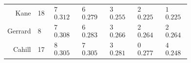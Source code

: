 \documentclass[10pt, a4paper]{UUThesisTemplate}
\begin{document}
\begin{table}[hb]
\begin{tabular}{r l c c c c c}
Kane & 18 & $\begin{matrix} \text{7} \\ 0.312 \end{matrix}$  & $\begin{matrix} \text{6} \\ 0.279 \end{matrix}$  & $\begin{matrix} \text{3} \\ 0.255 \end{matrix}$  & $\begin{matrix} \text{2} \\ 0.225 \end{matrix}$  & $\begin{matrix} \text{1} \\ 0.225 \end{matrix}$\\
Gerrard & 8 & $\begin{matrix} \text{7} \\ 0.308 \end{matrix}$  & $\begin{matrix} \text{6} \\ 0.283 \end{matrix}$  & $\begin{matrix} \text{3} \\ 0.266 \end{matrix}$  & $\begin{matrix} \text{2} \\ 0.264 \end{matrix}$  & $\begin{matrix} \text{2} \\ 0.264 \end{matrix}$\\
Cahill & 17 & $\begin{matrix} \text{8} \\ 0.305 \end{matrix}$  & $\begin{matrix} \text{7} \\ 0.305 \end{matrix}$  & $\begin{matrix} \text{3} \\ 0.281 \end{matrix}$  & $\begin{matrix} \text{0} \\ 0.277 \end{matrix}$  & $\begin{matrix} \text{4} \\ 0.248 \end{matrix}$\\

\end{tabular}
\end{table}
\end{document}

